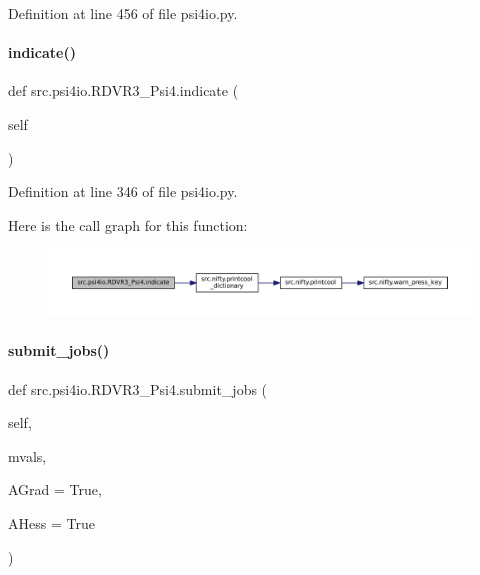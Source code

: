 Definition at line 456 of file psi4io.\+py.

\mbox{\label{classsrc_1_1psi4io_1_1RDVR3__Psi4_ae085fa527303ce6edea37e8312b4e349}} 
\paragraph{\texorpdfstring{indicate()}{indicate()}}
{\footnotesize\ttfamily def src.\+psi4io.\+R\+D\+V\+R3\+\_\+\+Psi4.\+indicate (\begin{DoxyParamCaption}\item[{}]{self }\end{DoxyParamCaption})}



Definition at line 346 of file psi4io.\+py.

Here is the call graph for this function\+:
\nopagebreak
\begin{figure}[H]
\begin{center}
\leavevmode
\includegraphics[width=350pt]{classsrc_1_1psi4io_1_1RDVR3__Psi4_ae085fa527303ce6edea37e8312b4e349_cgraph}
\end{center}
\end{figure}
\mbox{\label{classsrc_1_1psi4io_1_1RDVR3__Psi4_ac43c586173ba9bff909a1584862961ad}} 
\paragraph{\texorpdfstring{submit\+\_\+jobs()}{submit\_jobs()}}
{\footnotesize\ttfamily def src.\+psi4io.\+R\+D\+V\+R3\+\_\+\+Psi4.\+submit\+\_\+jobs (\begin{DoxyParamCaption}\item[{}]{self,  }\item[{}]{mvals,  }\item[{}]{A\+Grad = {\ttfamily True},  }\item[{}]{A\+Hess = {\ttfamily True} }\end{DoxyParamCaption})}



